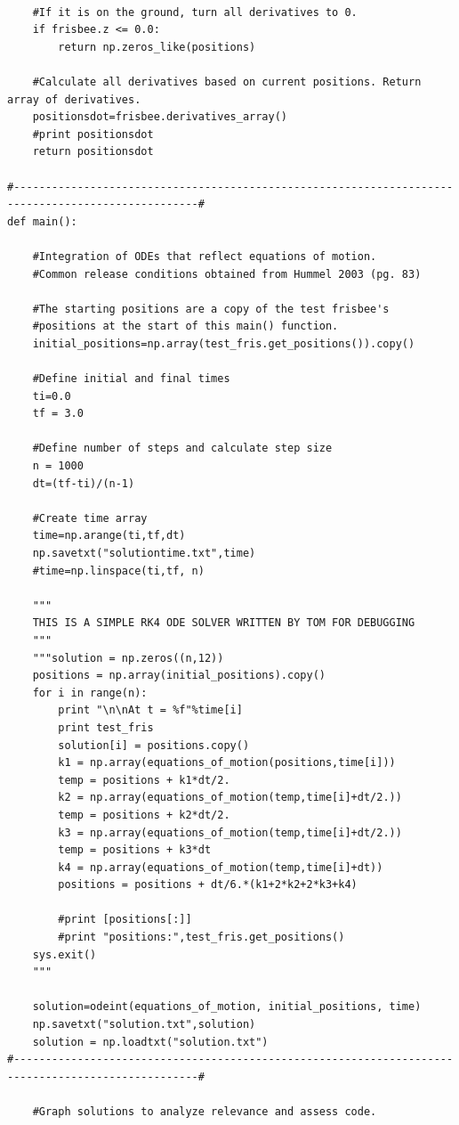 \documentclass[a4paper,12pt, oneside]{article}
\begin{document}
\begin{verbatim}
    
    #If it is on the ground, turn all derivatives to 0.
    if frisbee.z <= 0.0:
        return np.zeros_like(positions)

    #Calculate all derivatives based on current positions. Return array of derivatives.
    positionsdot=frisbee.derivatives_array()
    #print positionsdot
    return positionsdot

#---------------------------------------------------------------------------------------------------#
def main():

    #Integration of ODEs that reflect equations of motion.
    #Common release conditions obtained from Hummel 2003 (pg. 83)

    #The starting positions are a copy of the test frisbee's
    #positions at the start of this main() function.
    initial_positions=np.array(test_fris.get_positions()).copy()

    #Define initial and final times
    ti=0.0
    tf = 3.0

    #Define number of steps and calculate step size
    n = 1000
    dt=(tf-ti)/(n-1)

    #Create time array
    time=np.arange(ti,tf,dt)
    np.savetxt("solutiontime.txt",time)
    #time=np.linspace(ti,tf, n)

    """
    THIS IS A SIMPLE RK4 ODE SOLVER WRITTEN BY TOM FOR DEBUGGING
    """
    """solution = np.zeros((n,12))
    positions = np.array(initial_positions).copy()
    for i in range(n):
        print "\n\nAt t = %f"%time[i]
        print test_fris
        solution[i] = positions.copy()
        k1 = np.array(equations_of_motion(positions,time[i]))
        temp = positions + k1*dt/2.
        k2 = np.array(equations_of_motion(temp,time[i]+dt/2.))
        temp = positions + k2*dt/2.
        k3 = np.array(equations_of_motion(temp,time[i]+dt/2.))
        temp = positions + k3*dt
        k4 = np.array(equations_of_motion(temp,time[i]+dt))
        positions = positions + dt/6.*(k1+2*k2+2*k3+k4)

        #print [positions[:]]
        #print "positions:",test_fris.get_positions()
    sys.exit()
    """

    solution=odeint(equations_of_motion, initial_positions, time)
    np.savetxt("solution.txt",solution)
    solution = np.loadtxt("solution.txt")
#---------------------------------------------------------------------------------------------------#

    #Graph solutions to analyze relevance and assess code.
    

\end{verbatim}
\end{document}
